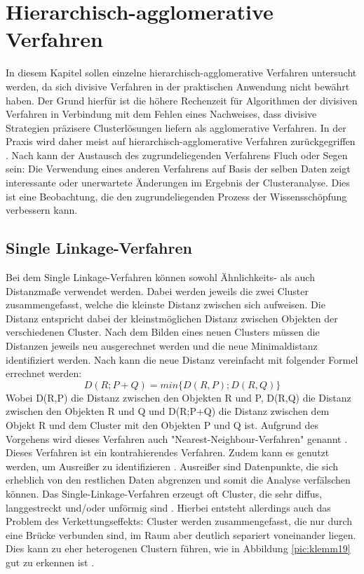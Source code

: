 \chapter{Hierarchisch-agglomerative Verfahren}
In diesem Kapitel sollen einzelne hierarchisch-agglomerative Verfahren untersucht werden, da sich divisive Verfahren in der praktischen Anwendung nicht bewährt haben. Der Grund hierfür ist die höhere Rechenzeit für Algorithmen der divisiven Verfahren in Verbindung mit dem Fehlen eines Nachweises, dass divisive Strategien präzisere Clusterlösungen liefern als agglomerative Verfahren. In der Praxis wird daher meist auf hierarchisch-agglomerative Verfahren zurückgegriffen \citep[Vgl.][S. 46]{Pedrycz.2010}.
Nach \citet[S.378]{Piegorsch.2015} kann der Austausch des zugrundeliegenden Verfahrens Fluch oder Segen sein: Die Verwendung eines anderen Verfahrens auf Basis der selben Daten zeigt interessante oder unerwartete Änderungen im Ergebnis der Clusteranalyse. Dies ist eine Beobachtung, die den zugrundeliegenden Prozess der Wissensschöpfung verbessern kann.

\section{Single Linkage-Verfahren}
Bei dem Single Linkage-Verfahren können sowohl Ähnlichkeits- als auch Distanzmaße verwendet werden. Dabei werden jeweils die zwei Cluster zusammengefasst, welche die kleinste Distanz zwischen sich aufweisen. Die Distanz entspricht dabei der kleinstmöglichen Distanz zwischen Objekten der verschiedenen Cluster. Nach dem Bilden eines neuen Clusters müssen die Distanzen jeweils neu ausgerechnet werden und die neue Minimaldistanz identifiziert werden.
Nach \citet[S.481]{Backhaus.2016} kann die neue Distanz vereinfacht mit folgender Formel errechnet werden:
\begin{equation}
	D(R;P+Q) = min\{D(R,P);D(R,Q)\}
\end{equation}
Wobei D(R,P) die Distanz zwischen den Objekten R und P, D(R,Q) die Distanz zwischen den Objekten R und Q und D(R;P+Q) die Distanz zwischen dem Objekt R und dem Cluster mit den Objekten P und Q ist.
Aufgrund des Vorgehens wird dieses Verfahren auch "Nearest-Neighbour-Verfahren" genannt \citep[Vgl.][S.231]{Eckey.2002}.
Dieses Verfahren ist ein kontrahierendes Verfahren. Zudem kann es genutzt werden, um Ausreißer zu identifizieren \citep[Vgl.][S. 481-483]{Backhaus.2016}. Ausreißer sind Datenpunkte, die sich erheblich von den restlichen Daten abgrenzen und somit die Analyse verfälschen können.
Das Single-Linkage-Verfahren erzeugt oft Cluster, die sehr diffus, langgestreckt und/oder unförmig sind \citep[Vgl.][S. 377]{Piegorsch.2015}.
Hierbei entsteht allerdings auch das Problem des Verkettungseffekts: Cluster werden zusammengefasst, die nur durch eine Brücke verbunden sind, im Raum aber deutlich separiert voneinander liegen. Dies kann zu eher heterogenen Clustern führen, wie in Abbildung \ref{pic:klemm19} gut zu erkennen ist \citep[Vgl.][S. 233]{Eckey.2002}. 

